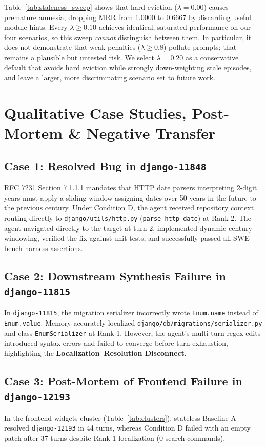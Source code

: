 \documentclass[conference]{IEEEtran}
\begin{document}
Table~\ref{tab:staleness_sweep} shows that hard eviction ($\lambda = 0.00$) causes premature amnesia, dropping MRR from 1.0000 to 0.6667 by discarding useful module hints. Every $\lambda \ge 0.10$ achieves identical, saturated performance on our four scenarios, so this sweep \emph{cannot} distinguish between them. In particular, it does not demonstrate that weak penalties ($\lambda \ge 0.8$) pollute prompts; that remains a plausible but untested risk. We select $\lambda = 0.20$ as a conservative default that avoids hard eviction while strongly down-weighting stale episodes, and leave a larger, more discriminating scenario set to future work.

\section{Qualitative Case Studies, Post-Mortem \& Negative Transfer}

\subsection{Case 1: Resolved Bug in \texttt{django-11848}}
RFC 7231 Section 7.1.1.1 mandates that HTTP date parsers interpreting 2-digit years must apply a sliding window assigning dates over 50 years in the future to the previous century. Under Condition D, the agent received repository context routing directly to \texttt{django/utils/http.py} (\texttt{parse\_http\_date}) at Rank 2. The agent navigated directly to the target at turn 2, implemented dynamic century windowing, verified the fix against unit tests, and successfully passed all SWE-bench harness assertions.

\subsection{Case 2: Downstream Synthesis Failure in \texttt{django-11815}}
In \texttt{django-11815}, the migration serializer incorrectly wrote \texttt{Enum.name} instead of \texttt{Enum.value}. Memory accurately localized \texttt{django/db/migrations/serializer.py} and class \texttt{EnumSerializer} at Rank 1. However, the agent's multi-turn regex edits introduced syntax errors and failed to converge before turn exhaustion, highlighting the \textbf{Localization--Resolution Disconnect}.

\subsection{Case 3: Post-Mortem of Frontend Failure in \texttt{django-12193}}
In the frontend widgets cluster (Table~\ref{tab:clusters}), stateless Baseline A resolved \texttt{django-12193} in 44 turns, whereas Condition D failed with an empty patch after 37 turns despite Rank-1 localization ($0$ search commands). 
\end{document}
